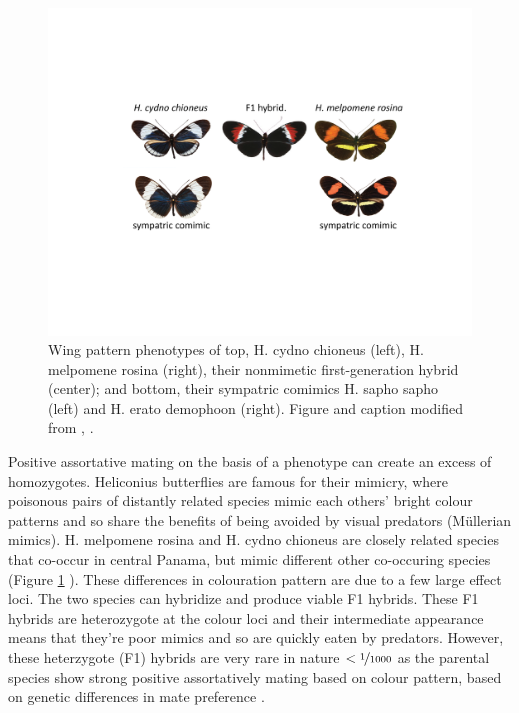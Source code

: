 {{%
\begin{figure}
\begin{center}  
  \includegraphics[width = \textwidth]{Journal_figs/alleles_genotypes/Heliconius_Merrill_assort_mating/labeled_trimmed_Heliconius_Merrill_assort_mating}
\end{center}
\caption{ Wing pattern phenotypes of top, H. cydno chioneus (left),
  H. melpomene rosina (right), their nonmimetic first-generation
  hybrid (center); and bottom, their sympatric comimics H. sapho sapho
  (left) and H. erato demophoon (right).  Figure and caption modified from \citet{merrill2019genetic},
  \PLOSccBY. }\label{fig:Heliconius_Merrill_assort}  
\end{figure}
Positive assortative mating on the basis of a phenotype can create an
excess of homozygotes. Heliconius butterflies are famous for their
mimicry, where poisonous pairs of
distantly related species mimic each others' bright colour patterns
and so share the benefits of being avoided by visual predators
(Müllerian mimics). H. melpomene rosina and H. cydno chioneus are
closely related species that co-occur in central Panama, but mimic
different other co-occuring species (Figure \ref{fig:Heliconius_Merrill_assort} ). These differences in colouration pattern
are due to a few large effect loci. The two species can hybridize and
produce viable F1 hybrids. These F1 hybrids are heterozygote at the
colour loci and their intermediate appearance means that they're poor
mimics and so are quickly eaten by predators. However, these heterzygote
(F1) hybrids are very rare in nature $< \nicefrac{1}{1000}$ as the parental species show
strong positive assortatively mating based on colour pattern, based on
genetic differences in mate preference \citet{merrill2019genetic}. 

}}
